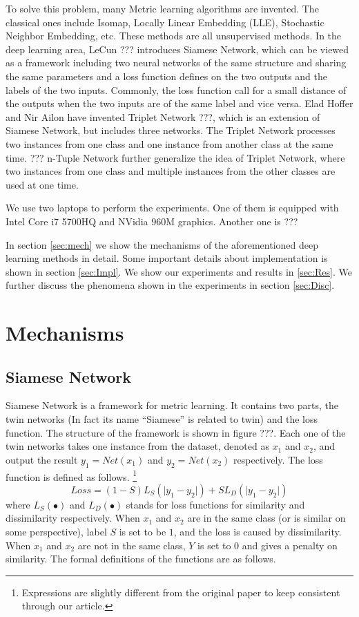 \documentclass[10pt,twocolumn,letterpaper]{article}
\begin{document}
	To solve this problem, many Metric learning algorithms are invented. The classical ones include Isomap, Locally Linear Embedding (LLE), Stochastic Neighbor Embedding, etc. These methods are all unsupervised methods. In the deep learning area, LeCun ??? introduces Siamese Network, which can be viewed as a framework including two neural networks of the same structure and sharing the same parameters and a loss function defines on the two outputs and the labels of the two inputs. Commonly, the loss function call for a small distance of the outputs when the two inputs are of the same label and vice versa. Elad Hoffer and Nir Ailon have invented Triplet Network ???, which is an extension of Siamese Network, but includes three networks. The Triplet Network processes two instances from one class and one instance from another class at the same time. ??? n-Tuple Network further generalize the idea of Triplet Network, where two instances from one class and multiple instances from the other classes are used at one time.
	
	We use two laptops to perform the experiments. One of them is equipped with Intel Core i7 5700HQ and NVidia 960M graphics. Another one is ???
	
	In section \ref{sec:mech} we show the mechanisms of the aforementioned deep learning methods in detail. Some important details about implementation is shown in section \ref{sec:Impl}. We show our experiments and results in \ref{sec:Res}. We further discuss the phenomena shown in the experiments in section \ref{sec:Disc}.
	
	\section{Mechanisms \label{sec:mech}}
		\subsection{Siamese Network}
			Siamese Network is a framework for metric learning. It contains two parts, the twin networks (In fact its name ``Siamese'' is related to twin) and the loss function. The structure of the framework is shown in figure ???. Each one of the twin networks takes one instance from the dataset, denoted as $x_1$ and $x_2$, and output the result $y_1 = Net(x_1)$ and $y_2 = Net(x_2)$ respectively. The loss function is defined as follows. \footnote{Expressions are slightly different from the original paper to keep consistent through our article.}
			\begin{equation}
				Loss = (1-S)L_S(\lvert y_1 - y_2 \rvert) + S L_D(\lvert y_1 - y_2 \rvert)
			\end{equation}
			where $L_S(\bullet)$ and $L_D(\bullet)$ stands for loss functions for similarity and dissimilarity respectively. When $x_1$ and $x_2$ are in the same class (or is similar on some perspective), label $S$ is set to be $1$, and the loss is caused by dissimilarity. When $x_1$ and $x_2$ are not in the same class, $Y$ is set to $0$ and gives a penalty on similarity. The formal definitions of the functions are as follows.
\end{document}
